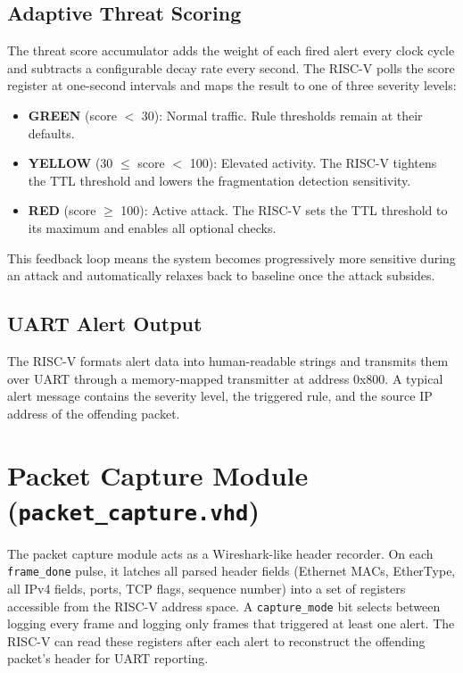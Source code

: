 \documentclass[12pt, a4paper]{report}
\begin{document}
\subsection{Adaptive Threat Scoring}

The threat score accumulator adds the weight of each fired alert every clock cycle and subtracts a configurable decay rate every second. The RISC-V polls the score register at one-second intervals and maps the result to one of three severity levels:

\begin{itemize}
    \item \textbf{GREEN} (score $<$ 30): Normal traffic. Rule thresholds remain at their defaults.
    \item \textbf{YELLOW} (30 $\leq$ score $<$ 100): Elevated activity. The RISC-V tightens the TTL threshold and lowers the fragmentation detection sensitivity.
    \item \textbf{RED} (score $\geq$ 100): Active attack. The RISC-V sets the TTL threshold to its maximum and enables all optional checks.
\end{itemize}

This feedback loop means the system becomes progressively more sensitive during an attack and automatically relaxes back to baseline once the attack subsides.

\subsection{UART Alert Output}

The RISC-V formats alert data into human-readable strings and transmits them over UART through a memory-mapped transmitter at address 0x800. A typical alert message contains the severity level, the triggered rule, and the source IP address of the offending packet.

\section{Packet Capture Module (\texttt{packet\_capture.vhd})}

The packet capture module acts as a Wireshark-like header recorder. On each \texttt{frame\_done} pulse, it latches all parsed header fields (Ethernet MACs, EtherType, all IPv4 fields, ports, TCP flags, sequence number) into a set of registers accessible from the RISC-V address space. A \texttt{capture\_mode} bit selects between logging every frame and logging only frames that triggered at least one alert. The RISC-V can read these registers after each alert to reconstruct the offending packet's header for UART reporting.
\end{document}
